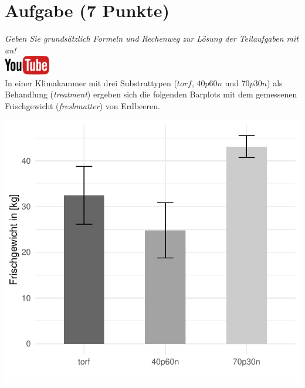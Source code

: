 \documentclass[a4paper, 9pt]{scrartcl}\usepackage[]{graphicx}\usepackage[]{xcolor}
\makeatletter
\def\maxwidth{ %
  \ifdim\Gin@nat@width>\linewidth
    \linewidth
  \else
    \Gin@nat@width
  \fi
}
\makeatother
\begin{document}
 
\clearpage

\section{Aufgabe \hfill (7 Punkte)}

\textit{Geben Sie grunds{\"a}tzlich Formeln und Rechenweg zur L{\"o}sung der
  Teilaufgaben mit an!} \\[1Ex]

\hfill\href{https://youtu.be/t0WYa_LVc5o}{\includegraphics[width = 2cm]{img/youtube}}\\[1Ex]



In einer Klimakammer mit drei Substrattypen ($torf$, $40p60n$ und $70p30n$) als Behandlung
(\textit{treatment}) ergeben sich die folgenden Barplots mit dem
gemessenen Frischgewicht (\textit{freshmatter}) von Erdbeeren.




{\centering \includegraphics[width=\maxwidth]{img/barplot-02-1} 

}
\end{document}
